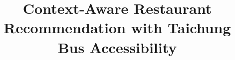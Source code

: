 \title{Context-Aware Restaurant Recommendation with Taichung Bus Accessibility}

\author{}

\coadvisorA{}
\coadvisorAzh{}

\coadvisorB{}
\coadvisorBzh{}

\field{}

\institute{}
\institutezh{}

\college{}

\university{}
\universityzh{}

\location{}

\degreemonth{}
\degreeyear{}
\degreeyearzh{}

\nation{}
\yearmonth{}

\watermark{}